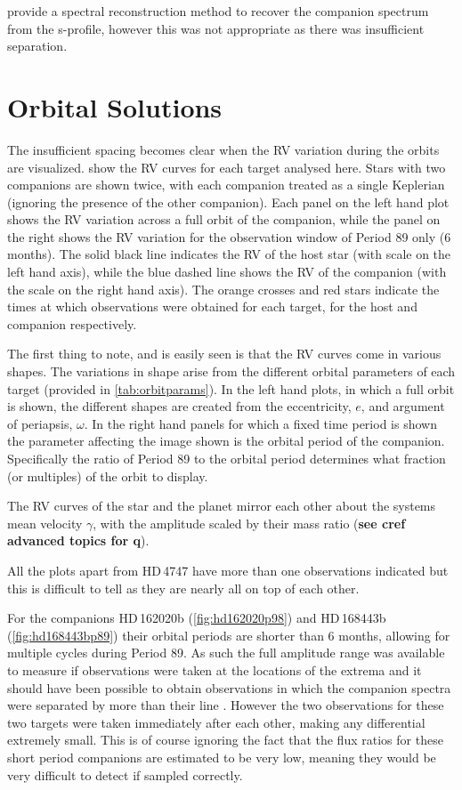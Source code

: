 \citet{ferluga_separating_1997} provide a spectral reconstruction method to recover the companion spectrum from the s-profile, however this was not appropriate as there was insufficient separation.


\section{Orbital Solutions}
\label{sec:orbtial_diagrams}
The insufficient spacing becomes clear when the RV variation during the orbits are visualized.
 show the RV curves for each target analysed here.
Stars with two companions are shown twice, with each companion treated as a single Keplerian (ignoring the presence of the other companion).
Each panel on the left hand plot shows the RV variation across a full orbit of the companion, while the panel on the right shows the RV variation for the observation window of Period 89 only (6 months).
The solid black line indicates the RV of the host star (with scale on the left hand axis), while the blue dashed line shows the RV of the companion (with the scale on the right hand axis).
The orange crosses and red stars indicate the times at which observations were obtained for each target, for the host and companion respectively.

The first thing to note, and is easily seen is that the RV curves come in various shapes.
The variations in shape arise from the different orbital parameters of each target (provided in \cref{tab:orbitparams}).
In the left hand plots, in which a full orbit is shown, the different shapes are created from the eccentricity, $e$, and argument of periapsis, $\omega$.
In the right hand panels for which a fixed time period is shown the parameter affecting the image shown is the orbital period of the companion.
Specifically the ratio of Period 89 to the orbital period determines what fraction (or multiples) of the orbit to display.

The RV curves of the star and the planet mirror each other about the systems mean velocity $\gamma$, with the amplitude scaled by their mass ratio (\textbf{see cref{} advanced topics for q}).

All the plots apart from {HD\,4747} have more than one observations indicated but this is difficult to tell as they are nearly all on top of each other.

For the companions {HD\,162020}b (\cref{fig:hd162020p98}) and {HD\,168443}b (\cref{fig:hd168443bp89}) their orbital periods are shorter than 6 months, allowing for multiple cycles during Period 89.
As such the full amplitude range was available to measure if observations were taken at the locations of the extrema and it should have been possible to obtain observations in which the companion spectra were separated by more than their line \fwhm.
However the two observations for these two targets were taken immediately after each other, making any differential extremely small.
This is of course ignoring the fact that the flux ratios for these short period companions are estimated to be very low, meaning they would be very difficult to detect if sampled correctly.

